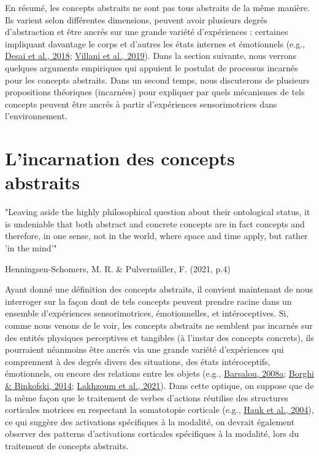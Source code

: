 \documentclass[
  a4paper,12pt,twoside,onecolumn,openright,final,oldfontcommands]{memoir}
\begin{document}
En résumé, les concepts abstraits ne sont pas tous abstraits de la même manière. Ils varient selon différentes dimensions, peuvent avoir plusieurs degrés d'abstraction et être ancrés sur une grande variété d'expériences : certaines impliquant davantage le corps et d'autres les états internes et émotionnels (e.g., \protect\hyperlink{ref-desai_multifaceted_2018}{Desai et al., 2018}; \protect\hyperlink{ref-villani_varieties_2019}{Villani et al., 2019}). Dans la section suivante, nous verrons quelques arguments empiriques qui appuient le postulat de processus incarnés pour les concepts abstraits. Dans un second temps, nous discuterons de plusieurs propositions théoriques (incarnées) pour expliquer par quels mécanismes de tels concepts peuvent être ancrés à partir d'expériences sensorimotrices dans l'environnement.

\hypertarget{incarnation}{%
\section{L'incarnation des concepts abstraits}\label{incarnation}}

\epigraph{"Leaving aside the highly philosophical question about their ontological status, it is undeniable that both abstract and concrete concepts are in fact concepts and therefore, in one sense, not in the world, where space and time apply, but rather 'in the mind'"}{Henningsen-Schomers, M. R. \& Pulvermüller, F. (2021, p.4)}

Ayant donné une définition des concepts abstraits, il convient maintenant de nous interroger sur la façon dont de tels concepts peuvent prendre racine dans un ensemble d'expériences sensorimotrices, émotionnelles, et intéroceptives. Si, comme nous venons de le voir, les concepts abstraits ne semblent pas incarnés sur des entités physiques perceptives et tangibles (à l'instar des concepts concrets), ils pourraient néanmoins être ancrés via une grande variété d'expériences qui comprennent à des degrés divers des situations, des états intéroceptifs, émotionnels, ou encore des relations entre les objets (e.g., \protect\hyperlink{ref-barsalou_grounded_2008}{Barsalou, 2008a}; \protect\hyperlink{ref-borghi_words_2014}{Borghi \& Binkofski, 2014}; \protect\hyperlink{ref-lakhzoum_semantic_2021}{Lakhzoum et al., 2021}). Dans cette optique, on suppose que de la même façon que le traitement de verbes d'actions réutilise des structures corticales motrices en respectant la somatotopie corticale (e.g., \protect\hyperlink{ref-hauk_somatotopic_2004}{Hauk et al., 2004}), ce qui suggère des activations spécifiques à la modalité, on devrait également observer des patterns d'activations corticales spécifiques à la modalité, lors du traitement de concepts abstraits.
\end{document}
